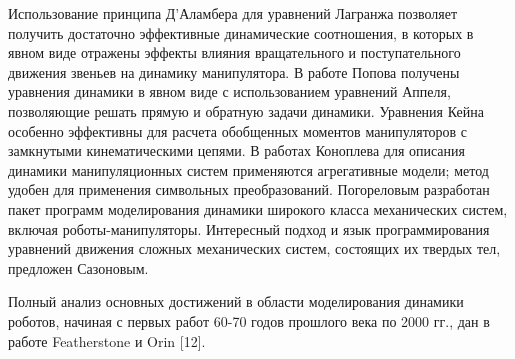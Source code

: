 Использование принципа Д'Аламбера для уравнений Лагранжа позволяет получить достаточно эффективные динамические соотношения, в которых в явном виде отражены эффекты влияния вращательного и поступательного движения звеньев на динамику манипулятора. В работе Попова получены уравнения динамики в явном виде с использованием уравнений Аппеля, позволяющие решать прямую и обратную задачи динамики. Уравнения Кейна особенно эффективны для расчета обобщенных моментов манипуляторов с замкнутыми кинематическими цепями. В работах Коноплева для описания динамики манипуляционных систем применяются агрегативные модели; метод удобен для применения символьных преобразований. Погореловым разработан пакет программ моделирования динамики широкого класса механических систем, включая роботы-манипуляторы. Интересный подход и язык программирования уравнений движения сложных механических систем, состоящих их твердых тел, предложен Сазоновым.

Полный анализ основных достижений в области моделирования динамики роботов, начиная с первых работ 60-70 годов прошлого века по 2000 гг., дан в работе Featherstone и Orin [12].

